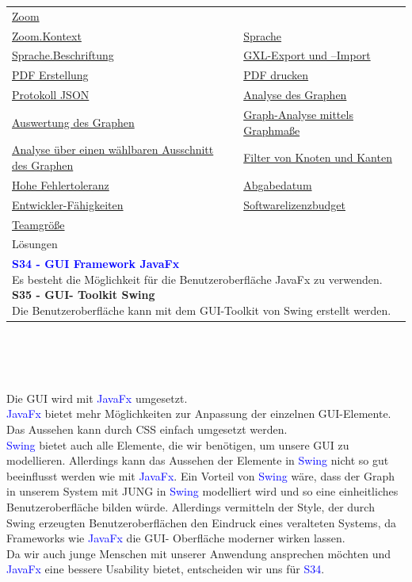 \documentclass[enabledeprecatedfontcommands,fontsize=11pt,paper=a4,twoside]{scrartcl}
\newcounter{one}
\newcommand{\cb}[1]{{\textcolor{blue}{#1}}}
\begin{document}
\begin{tabular} {|p{8cm} p{8cm}|}
	\hyperlink {ee}{Zoom} \\
	\hyperlink {ff}{Zoom.Kontext} &
	\hyperlink {gg}{Sprache} \\
	\hyperlink {hh}{Sprache.Beschriftung} &
	\hyperlink {jj}{GXL-Export und –Import} \\
	\hyperlink {kk}{PDF Erstellung} &
	\hyperlink {ll}{PDF drucken} \\
	\hyperlink {mm}{Protokoll JSON} &
	\hyperlink {oo}{Analyse des Graphen} \\
	\hyperlink {pp}{Auswertung des Graphen} &
	\hyperlink {qq}{Graph-Analyse mittels Graphmaße} \\ 
	\hyperlink {rr}{Analyse über einen wählbaren Ausschnitt des Graphen} &
	\hyperlink {ss}{Filter von Knoten und Kanten} \\
	\hyperlink {tt}{Hohe Fehlertoleranz} &
	\hyperlink {uu}{Abgabedatum} \\
	\hyperlink {vv}{Entwickler-Fähigkeiten} &
	\hyperlink {ww}{Softwarelizenzbudget} \\
	\hyperlink {xx}{Teamgröße} &
	\\ \hline
	\multicolumn{2}{|l|}{Lösungen} \\
	\multicolumn{2}{|l|}{\parbox{16cm}{
			\textbf{\cb{\hypertarget{kkk}{S34 - GUI Framework JavaFx}}} \\
			Es besteht die Möglichkeit für die Benutzeroberfläche JavaFx zu verwenden. 
			\textbf{S35 - GUI- Toolkit Swing} \\
			Die Benutzeroberfläche kann mit dem GUI-Toolkit von Swing erstellt werden.
	} }\\ \hline
\end{tabular}\\ \\ \\
\begin{onehalfspace}
	Die GUI wird mit \cb{JavaFx} umgesetzt. \\
	\cb{JavaFx} bietet mehr Möglichkeiten zur Anpassung der einzelnen GUI-Elemente. Das Aussehen kann durch CSS einfach umgesetzt werden. \\
	\cb{Swing} bietet auch alle Elemente, die wir benötigen, um unsere GUI zu modellieren. Allerdings kann das Aussehen der Elemente in \cb{Swing} nicht so gut beeinflusst werden wie mit \cb{JavaFx}. Ein Vorteil von \cb{Swing} wäre, dass der Graph in unserem System mit JUNG in \cb{Swing} modelliert wird und so eine einheitliches Benutzeroberfläche bilden würde. Allerdings vermitteln der Style, der durch Swing erzeugten Benutzeroberflächen den Eindruck eines veralteten Systems, da Frameworks wie \cb{JavaFx} die GUI- Oberfläche moderner wirken lassen. \\
	Da wir auch junge Menschen mit unserer Anwendung ansprechen möchten und \cb{JavaFx} eine bessere Usability bietet, entscheiden wir uns für \cb{S34}.
\end{onehalfspace}
\end{document}

